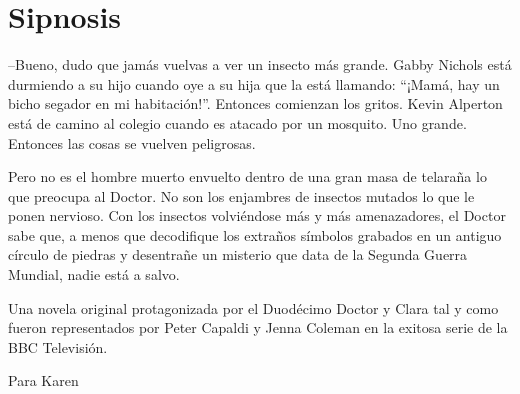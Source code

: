 \chapter*{Sipnosis}

{--Bueno, dudo que jamás vuelvas a ver un insecto más grande.
Gabby Nichols está durmiendo a su hijo cuando oye a su hija que la está
llamando: ``¡Mamá, hay un bicho segador en mi habitación!''. Entonces
comienzan los gritos. Kevin Alperton está de camino al colegio
cuando es atacado por un mosquito. Uno grande. Entonces las cosas se
vuelven peligrosas.}




{Pero no es el hombre muerto envuelto dentro de una gran masa de telaraña
lo que preocupa al Doctor. No son los enjambres de insectos mutados lo
que le ponen nervioso. Con los insectos volviéndose más y más
amenazadores, el Doctor sabe que, a menos que decodifique los extraños
símbolos grabados en un antiguo círculo de piedras y desentrañe un
misterio que data de la Segunda Guerra Mundial, nadie está a
salvo.}


{Una novela original protagonizada por el
Duodécimo Doctor y Clara tal y como fueron representados por Peter
Capaldi y Jenna Coleman en la exitosa serie de la BBC Televisión.}


\newpage
{Para Karen}
